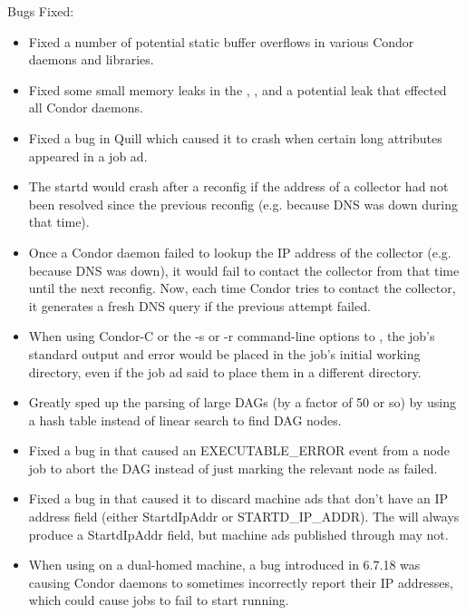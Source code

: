 \noindent Bugs Fixed:

\begin{itemize}

\item Fixed a number of potential static buffer overflows in various
  Condor daemons and libraries.

\item Fixed some small memory leaks in the ,
  , and a potential leak that effected all Condor
  daemons.

\item Fixed a bug in Quill which caused it to crash when certain
long attributes appeared in a job ad.

\item The startd would crash after a reconfig if the address of a
collector had not been resolved since the previous reconfig
(e.g. because DNS was down during that time).

\item Once a Condor daemon failed to lookup the IP address of the
collector (e.g. because DNS was down), it would fail to contact the
collector from that time until the next reconfig.  Now, each time Condor
tries to contact the collector, it generates a fresh DNS query if the
previous attempt failed.

\item When using Condor-C or the -s or -r command-line options to
, the job's standard output and error would be placed
in the job's initial working directory, even if the job ad said to
place them in a different directory.

\item Greatly sped up the parsing of large DAGs (by a factor of 50
or so) by using a hash table instead of linear search to find DAG nodes.

\item Fixed a bug in  that caused an EXECUTABLE\_ERROR
event from a node job to abort the DAG instead of just marking the
relevant node as failed.

\item Fixed a bug in  that caused it to discard
machine ads that don't have an IP address field (either StartdIpAddr
or STARTD\_IP\_ADDR).  The  will always produce a
StartdIpAddr field, but machine ads published through
 may not.

\item When using  on a dual-homed
machine, a bug introduced in 6.7.18 was causing Condor daemons to
sometimes incorrectly report their IP addresses, which could cause
jobs to fail to start running.


\end{itemize}
